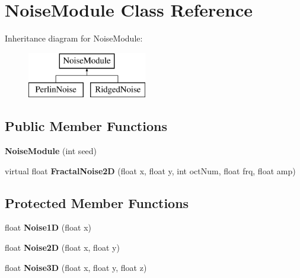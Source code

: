 \hypertarget{class_noise_module}{}\section{Noise\+Module Class Reference}
\label{class_noise_module}
Inheritance diagram for Noise\+Module\+:\begin{figure}[H]
\begin{center}
\leavevmode
\includegraphics[height=2.000000cm]{class_noise_module}
\end{center}
\end{figure}
\subsection*{Public Member Functions}
\begin{DoxyCompactItemize}
\item 
\mbox{\label{class_noise_module_a018e785221494e50a0c4c0b72e71cf33}} 
{\bfseries Noise\+Module} (int seed)
\item 
\mbox{\label{class_noise_module_afafa2edc32e9762dd4b379bede65ad16}} 
virtual float {\bfseries Fractal\+Noise2D} (float x, float y, int oct\+Num, float frq, float amp)
\end{DoxyCompactItemize}
\subsection*{Protected Member Functions}
\begin{DoxyCompactItemize}
\item 
\mbox{\label{class_noise_module_a2bc5a6d90d2eb98c784049b2ed22d8f9}} 
float {\bfseries Noise1D} (float x)
\item 
\mbox{\label{class_noise_module_ae937ab94facd72d00bd6c226804010d1}} 
float {\bfseries Noise2D} (float x, float y)
\item 
\mbox{\label{class_noise_module_aaf19713b7b0fb83b7561a0a6f9a23cf9}} 
float {\bfseries Noise3D} (float x, float y, float z)
\end{DoxyCompactItemize}
